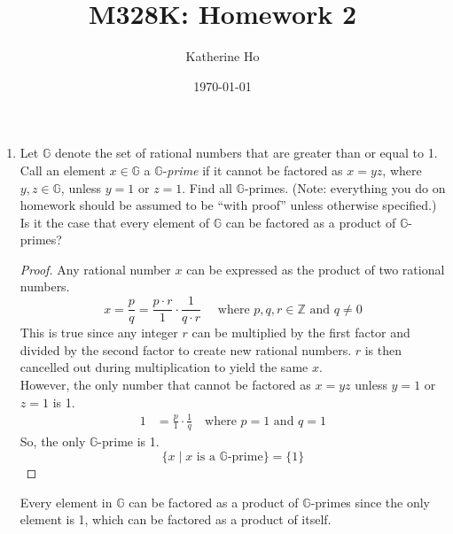 \documentclass[11pt]{article}
\title{M328K: Homework 2}
\author{Katherine Ho}
\date\today
\newcommand{\ZZ}{\mathbb{Z}}
\begin{document}
\maketitle
    \begin{enumerate}
    \item Let $\mathbb G$ denote the set of rational numbers that are greater than or
    equal to 1. Call an element $x\in \mathbb G$ a $\mathbb G$-\emph{prime} if it
    cannot be factored as $x=yz$, where $y,z\in \mathbb G$, unless $y=1$ or $z=1$. Find
    all $\mathbb G$-primes. (Note: everything you do on homework should be assumed
    to be ``with proof'' unless otherwise specified.) Is it the case that every
    element of $\mathbb G$ can be factored as a product of $\mathbb G$-primes?
    \begin{proof}
        Any rational number $x$ can be expressed as the product of two rational numbers.
        \[ 
            x=\frac{p}{q}=\frac{p\cdot r}{1}\cdot\frac{1}{q\cdot r} \quad\text{ where } p,q,r\in\ZZ \text{ and } q\ne 0
        \]
        This is true since any integer $r$ can be multiplied by the first factor and divided by the 
        second factor to create new rational numbers.
        $r$ is then cancelled out during multiplication to yield the same $x$. \\
        However, the only number that cannot be factored as $x=yz$ unless $y=1$ or $z=1$ is 1.
        \begin{align*}
            1 &= \frac{p}{1}\cdot\frac{1}{q} \quad\text{where } p=1 \text{ and } q=1
        \end{align*}
        So, the only $\mathbb{G}$-prime is 1.
        \[ \{x\mid x\text{ is a }\mathbb{G}\text{-prime} \} = \{ 1 \} \]
    \end{proof}
    Every element in $\mathbb{G}$ can be factored as a product of $\mathbb G$-primes since 
    the only element is 1, which can be factored as a product of itself.


\end{enumerate}
\end{document}
